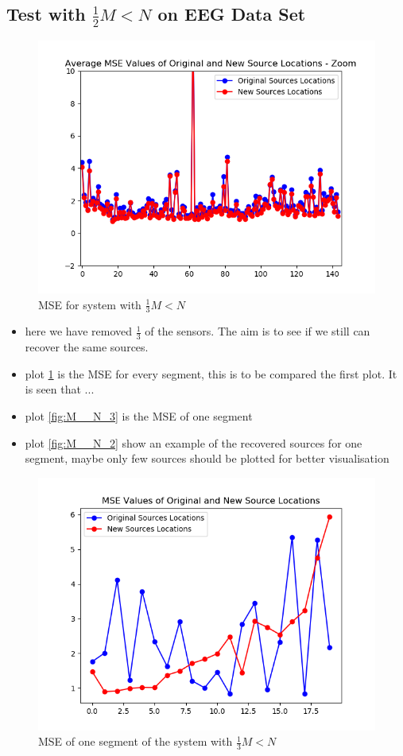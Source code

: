 \subsection{Test with $\frac{1}{2} M<N$ on EEG Data Set}
\begin{figure}[H]
    \centering
	\includegraphics[scale=0.5]{figures/ch_7/M__N_1.png}
	\caption{MSE for system with $\frac{1}{3} M<N$}
	\label{fig:M__N_1}
\end{figure}  
\begin{itemize}
\item  here we have removed $\frac{1}{3}$ of the sensors. The aim is to see if we still can recover the same sources. 
\item plot \ref{fig:M__N_1} is the MSE for every segment, this is to be compared the first plot. It is seen that ...
\item plot \ref{fig:M__N_3} is the MSE of one segment 
\item plot \ref{fig:M__N_2} show an example of the recovered sources for one segment, maybe only few sources should be plotted for better visualisation
\end{itemize}
\begin{figure}[H]
    \centering
	\includegraphics[scale=0.5]{figures/ch_7/M__N_3.png}
	\caption{MSE of one segment of the system with $\frac{1}{3} M<N$}
	\label{fig:M_N_3}
\end{figure}
